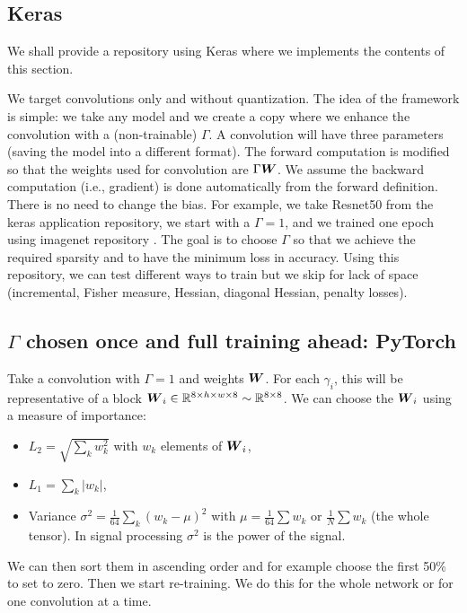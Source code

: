 \documentclass[sigconf]{acmart}
\begin{document}
\subsection{Keras}
We shall provide a repository using Keras \cite{chollet2015keras}
where we implements the contents of this section. %

We target convolutions only and without quantization. The idea of the
framework is simple: we take any model and we create a copy where we
enhance the convolution with a (non-trainable) $\Gamma$. A convolution
will have three parameters (saving the model into a different format).
The forward computation is modified so that the weights used for
convolution are $\Gamma{\boldsymbol W}$. We assume the backward computation
(i.e., gradient) is done automatically from the forward
definition. There is no need to change the bias. For example, we take
Resnet50 from the keras application repository, we start with a
$\Gamma=1$, and we trained one epoch using imagenet repository
\cite{deng2009imagenet}.  The goal is to choose $\Gamma$ so that we
achieve the required sparsity and to have the minimum loss in
accuracy. Using this repository, we can test different ways to train
but we skip for lack of space (incremental, Fisher measure, Hessian,
diagonal Hessian, penalty losses).

\subsection{$\Gamma$ chosen once and full training ahead: PyTorch}
\label{sec:one-mask}
\label{sec:pytorch}
Take a convolution with $\Gamma = 1$ and weights ${\boldsymbol W}$. For each
$\gamma_i$, this will be representative of a block ${\boldsymbol W}_i \in \mathbb{R}^{8
  \times h \times w \times 8} \sim \mathbb{R}^{8\times 8}$. We can choose the
${\boldsymbol W}_i$ using a measure of importance:
\begin{itemize}
  \item $L_2 = \sqrt{\sum_k w_k^2}$ with $w_k$ elements of ${\boldsymbol W}_i$,
  \item $L_1 = \sum_k |w_k|$,
  \item Variance $\sigma^2 = \frac{1}{64}\sum_k (w_k -\mu)^2$ with
    $\mu = \frac{1}{64}\sum w_k $ or $\frac{1}{N}\sum w_k$ (the whole
    tensor). In signal processing $\sigma^2$ is the power of the
    signal.
\end{itemize}
We can then sort them in ascending order and for example choose the
first 50\% to set to zero. Then we start re-training. We do this for
the whole network or for one convolution at a time. 
\end{document}
